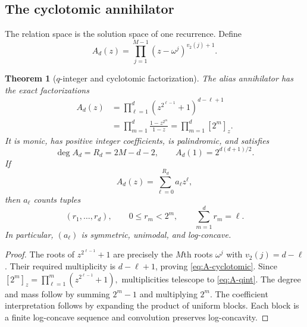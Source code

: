 \documentclass[11pt,oneside]{article}
\newtheorem{theorem}{Theorem}[section]
\theoremstyle{definition}
\theoremstyle{remark}
\newcommand{\vtwo}{v_2}
\begin{document}
\subsection{The cyclotomic annihilator}
The relation space is the solution space of one recurrence.  Define
\begin{equation}
 A_d(z)=\prod_{j=1}^{M-1}(z-\omega^j)^{\vtwo(j)+1}.        \label{eq:A-roots}
\end{equation}

\begin{theorem}[$q$-integer and cyclotomic factorization]
\label{thm:A-factor}
The alias annihilator has the exact factorizations
\begin{align}
 A_d(z)
 &=\prod_{\ell=1}^{d}
   (z^{2^{\ell-1}}+1)^{d-\ell+1}                         \label{eq:A-cyclotomic}\\
 &=\prod_{m=1}^{d}\frac{1-z^{2^m}}{1-z}
 =\prod_{m=1}^{d}[2^m]_z.                                \label{eq:A-qint}
\end{align}
It is monic, has positive integer coefficients, is palindromic, and satisfies
\begin{equation}
 \deg A_d=R_d=2M-d-2,
 \qquad
 A_d(1)=2^{d(d+1)/2}.                                     \label{eq:A-degree-mass}
\end{equation}
If
\begin{equation}
 A_d(z)=\sum_{\ell=0}^{R_d}a_\ell z^\ell,                \label{eq:A-coeff}
\end{equation}
then $a_\ell$ counts tuples
\begin{equation}
 (r_1,\ldots,r_d),\qquad
 0\le r_m<2^m,\qquad \sum_{m=1}^{d}r_m=\ell.            \label{eq:A-counting}
\end{equation}
In particular, $(a_\ell)$ is symmetric, unimodal, and log-concave.
\end{theorem}

\begin{proof}
The roots of $z^{2^{\ell-1}}+1$ are precisely the $M$th roots $\omega^j$ with $\vtwo(j)=d-\ell$.  Their required multiplicity is $d-\ell+1$, proving \eqref{eq:A-cyclotomic}.  Since
\(
 [2^m]_z=\prod_{\ell=1}^{m}(z^{2^{\ell-1}}+1),
\)
multiplicities telescope to \eqref{eq:A-qint}.  The degree and mass follow by summing $2^m-1$ and multiplying $2^m$.  The coefficient interpretation follows by expanding the product of uniform blocks.  Each block is a finite log-concave sequence and convolution preserves log-concavity.
\end{proof}
\end{document}
